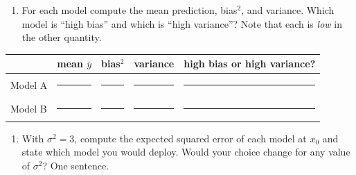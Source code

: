 \documentclass[
  11pt,
]{article}
\newcounter{none} %
\providecommand{\tightlist}{%
  \setlength{\itemsep}{0pt}\setlength{\parskip}{0pt}}
\newcommand{\answerspace}[1]{\par\vspace*{#1}}  %
\newcommand{\blank}[1][1.2in]{\rule{#1}{0.4pt}}
\begin{document}
\newpage

\begin{enumerate}
\def\labelenumi{(\alph{enumi})}
\tightlist
\item
  For each model compute the mean prediction, bias\(^2\), and variance.
  Which model is ``high bias'' and which is ``high variance''? Note that
  each is \emph{low} in the other quantity.
\end{enumerate}

{\def\LTcaptype{none} %
\begin{longtable}[]{@{}
  >{\raggedright\arraybackslash}p{}
  >{\raggedright\arraybackslash}p{}
  >{\raggedright\arraybackslash}p{}
  >{\raggedright\arraybackslash}p{}
  >{\raggedright\arraybackslash}p{}@{}}
\toprule\noalign{}
\begin{minipage}[b]{\linewidth}\raggedright
\end{minipage} & \begin{minipage}[b]{\linewidth}\raggedright
mean \(\bar y\)
\end{minipage} & \begin{minipage}[b]{\linewidth}\raggedright
bias\(^2\)
\end{minipage} & \begin{minipage}[b]{\linewidth}\raggedright
variance
\end{minipage} & \begin{minipage}[b]{\linewidth}\raggedright
high bias or high variance?
\end{minipage} \\
\midrule\noalign{}
\endhead
\bottomrule\noalign{}
\endlastfoot
Model A & \blank[0.7in] & \blank[0.7in] & \blank[0.7in] &
\blank[1.4in] \\
Model B & \blank[0.7in] & \blank[0.7in] & \blank[0.7in] &
\blank[1.4in] \\
\end{longtable}
}

\answerspace{2.5in}

\begin{enumerate}
\def\labelenumi{(\alph{enumi})}
\setcounter{enumi}{1}
\tightlist
\item
  With \(\sigma^2 = 3\), compute the expected squared error of each
  model at \(x_0\) and state which model you would deploy. Would your
  choice change for any value of \(\sigma^2\)? One sentence.
\end{enumerate}
\end{document}
